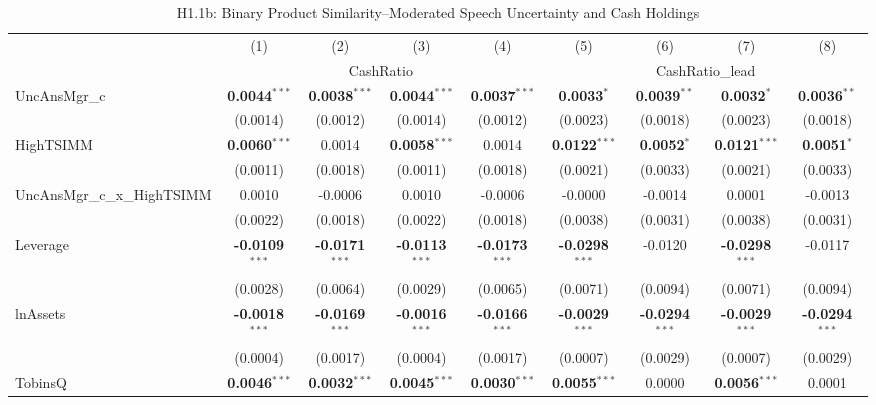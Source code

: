 \begin{landscape}
\begin{table}[H]
\setlength{\tabcolsep}{3pt}
\renewcommand{\arraystretch}{0.85}
\centering
\caption{H1.1b: Binary Product Similarity--Moderated Speech Uncertainty and Cash Holdings}
\label{tab:h1_1b}
\scriptsize
\begin{tabular}{lcccccccc}
\toprule
 & (1) & (2) & (3) & (4) & (5) & (6) & (7) & (8) \\
 & \multicolumn{4}{c}{CashRatio} & \multicolumn{4}{c}{CashRatio\_lead} \\
\cmidrule(lr){2-5} \cmidrule(lr){6-9}
\midrule
UncAnsMgr\_c & \textbf{0.0044}$^{***}$ & \textbf{0.0038}$^{***}$ & \textbf{0.0044}$^{***}$ & \textbf{0.0037}$^{***}$ & \textbf{0.0033}$^{*}$ & \textbf{0.0039}$^{**}$ & \textbf{0.0032}$^{*}$ & \textbf{0.0036}$^{**}$ \\
 & (0.0014) & (0.0012) & (0.0014) & (0.0012) & (0.0023) & (0.0018) & (0.0023) & (0.0018) \\
HighTSIMM & \textbf{0.0060}$^{***}$ & 0.0014 & \textbf{0.0058}$^{***}$ & 0.0014 & \textbf{0.0122}$^{***}$ & \textbf{0.0052}$^{*}$ & \textbf{0.0121}$^{***}$ & \textbf{0.0051}$^{*}$ \\
 & (0.0011) & (0.0018) & (0.0011) & (0.0018) & (0.0021) & (0.0033) & (0.0021) & (0.0033) \\
UncAnsMgr\_c\_x\_HighTSIMM & 0.0010 & -0.0006 & 0.0010 & -0.0006 & -0.0000 & -0.0014 & 0.0001 & -0.0013 \\
 & (0.0022) & (0.0018) & (0.0022) & (0.0018) & (0.0038) & (0.0031) & (0.0038) & (0.0031) \\
\midrule
Leverage & \textbf{-0.0109}$^{***}$ & \textbf{-0.0171}$^{***}$ & \textbf{-0.0113}$^{***}$ & \textbf{-0.0173}$^{***}$ & \textbf{-0.0298}$^{***}$ & -0.0120 & \textbf{-0.0298}$^{***}$ & -0.0117 \\
 & (0.0028) & (0.0064) & (0.0029) & (0.0065) & (0.0071) & (0.0094) & (0.0071) & (0.0094) \\
lnAssets & \textbf{-0.0018}$^{***}$ & \textbf{-0.0169}$^{***}$ & \textbf{-0.0016}$^{***}$ & \textbf{-0.0166}$^{***}$ & \textbf{-0.0029}$^{***}$ & \textbf{-0.0294}$^{***}$ & \textbf{-0.0029}$^{***}$ & \textbf{-0.0294}$^{***}$ \\
 & (0.0004) & (0.0017) & (0.0004) & (0.0017) & (0.0007) & (0.0029) & (0.0007) & (0.0029) \\
TobinsQ & \textbf{0.0046}$^{***}$ & \textbf{0.0032}$^{***}$ & \textbf{0.0045}$^{***}$ & \textbf{0.0030}$^{***}$ & \textbf{0.0055}$^{***}$ & 0.0000 & \textbf{0.0056}$^{***}$ & 0.0001 \\

\end{tabular}
\end{table}
\end{landscape}
